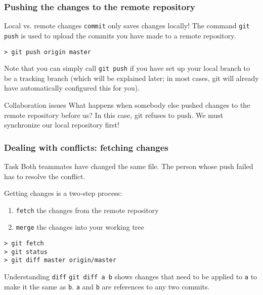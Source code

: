 \begin{frame}[fragile]
	\frametitle{Pushing the changes to the remote repository}
	
	\begin{block}{Local vs. remote changes}
	\texttt{commit} only saves changes \alert{locally}! The command \texttt{git push} is used to upload the commits you have made to a remote repository. 
	
	\begin{verbatim}
> git push origin master
	\end{verbatim}
	\end{block}

Note that you can simply call \texttt{git push} if you have set up your local branch to be a tracking branch (which will be explained later; in most cases, git will already have automatically configured this for you).

	\begin{block}{Collaboration issues}
What happens when somebody else pushed changes to the remote repository before us? In this case, git refuses to push. We must synchronize our local repository first!
	\end{block}	
	
\end{frame}



\begin{frame}[fragile]
	\frametitle{Dealing with conflicts: fetching changes}

	\begin{block}{Task}
	Both teammates have changed the same file. The person whose push failed has to resolve the conflict.	
	\end{block}
	
	Getting changes is a two-step process:
	\begin{enumerate}
		\item \texttt{fetch} the changes from the remote repository
		\item \texttt{merge} the changes into your working tree
	\end{enumerate}
	
	\begin{verbatim}
> git fetch
> git status
> git diff master origin/master
	\end{verbatim}
	
	\begin{block}{Understanding \texttt{diff}}
	\texttt{git diff a b} shows changes that need to be applied to \texttt{a} to make it the same as \texttt{b}. \texttt{a} and \texttt{b} are references to any two commits.
	\end{block}
	
\end{frame}

